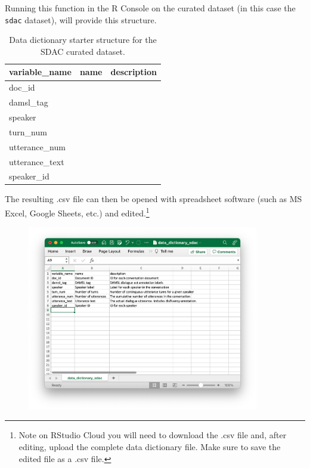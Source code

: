 \documentclass[
  letterpaper,
]{latex/krantz}
\begin{document}
Running this function in the R Console on the curated dataset (in this
case the \texttt{sdac} dataset), will provide this structure.

\hypertarget{tbl-cd-documentation-dic-starter-structure}{}
\begin{table}
\caption{\label{tbl-cd-documentation-dic-starter-structure}Data dictionary starter structure for the SDAC curated dataset. }\tabularnewline

\centering
\begin{tabular}{lll}
\toprule
variable\_name & name & description\\
\midrule
doc\_id &  & \\
damsl\_tag &  & \\
speaker &  & \\
turn\_num &  & \\
utterance\_num &  & \\
\addlinespace
utterance\_text &  & \\
speaker\_id &  & \\
\bottomrule
\end{tabular}
\end{table}

The resulting .csv file can then be opened with spreadsheet software
(such as MS Excel, Google Sheets, etc.) and edited.\footnote{Note on
  RStudio Cloud you will need to download the .csv file and, after
  editing, upload the complete data dictionary file. Make sure to save
  the edited file as a .csv file.}

\begin{figure}[h]

{\centering \includegraphics[width=0.9\textwidth,height=\textheight]{./figures/curate-datasets/cd-data-dictionary.png}

}

\end{figure}
\end{document}
